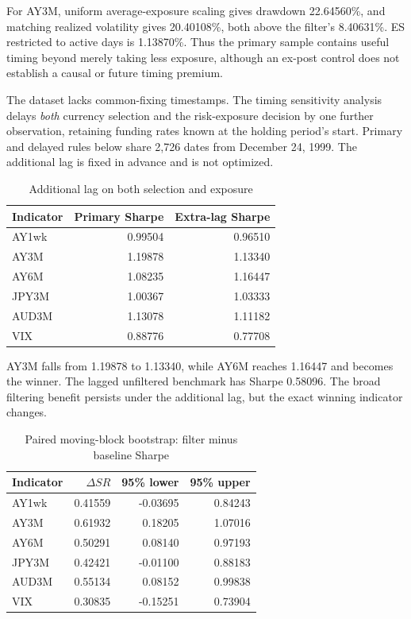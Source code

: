 \documentclass[10pt,letterpaper]{article}
\newcommand{\rCondDD}{8.40631}
\newcommand{\rConstDD}{22.64560}
\newcommand{\rVolMatchDD}{20.40108}
\newcommand{\rActiveES}{1.13870}
\newcommand{\rLagBase}{0.58096}
\newcommand{\rLagAY}{1.13340}
\newcommand{\rLagSix}{1.16447}
\newcommand{\rLagPrimaryAY}{1.19878}
\begin{document}
For AY3M, uniform average-exposure scaling gives drawdown \rConstDD{}\%, and matching realized
volatility gives \rVolMatchDD{}\%, both above the filter's \rCondDD{}\%. ES restricted to active
days is \rActiveES{}\%. Thus the primary sample contains useful timing beyond merely taking
less exposure, although an ex-post control does not establish a causal or future timing premium.

The dataset lacks common-fixing timestamps. The timing sensitivity analysis delays \emph{both}
currency selection and the risk-exposure decision by one further observation, retaining funding
rates known at the holding period's start. Primary and delayed rules below share 2,726 dates
from December 24, 1999. The additional lag is fixed in advance and is not optimized.
\begin{table}[H]\centering\small\caption{Additional lag on both selection and exposure}
\begin{tabular}{lrr}\toprule
Indicator & Primary Sharpe & Extra-lag Sharpe\\\midrule
AY1wk & 0.99504 & 0.96510\\
AY3M & 1.19878 & 1.13340\\
AY6M & 1.08235 & 1.16447\\
JPY3M & 1.00367 & 1.03333\\
AUD3M & 1.13078 & 1.11182\\
VIX & 0.88776 & 0.77708\\
\bottomrule\end{tabular}\end{table}

AY3M falls from \rLagPrimaryAY{} to \rLagAY{}, while AY6M reaches \rLagSix{} and becomes the
winner. The lagged unfiltered benchmark has Sharpe \rLagBase{}. The broad filtering benefit
persists under the additional lag, but the exact winning indicator changes.
\begin{table}[H]\centering\small\caption{Paired moving-block bootstrap: filter minus baseline Sharpe}
\begin{tabular}{lrrr}\toprule
Indicator & $\Delta SR$ & 95\% lower & 95\% upper\\\midrule
AY1wk & 0.41559 & -0.03695 & 0.84243\\
AY3M & 0.61932 & 0.18205 & 1.07016\\
AY6M & 0.50291 & 0.08140 & 0.97193\\
JPY3M & 0.42421 & -0.01100 & 0.88183\\
AUD3M & 0.55134 & 0.08152 & 0.99838\\
VIX & 0.30835 & -0.15251 & 0.73904\\
\bottomrule\end{tabular}\end{table}
\end{document}
